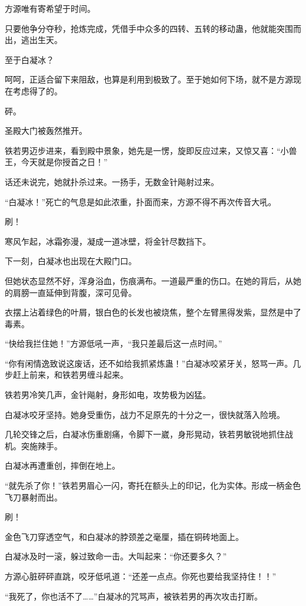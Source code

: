 \begin{this_body}
方源唯有寄希望于时间。

只要他争分夺秒，抢炼完成，凭借手中众多的四转、五转的移动蛊，他就能突围而出，逃出生天。

至于白凝冰？

呵呵，正适合留下来阻敌，也算是利用到极致了。至于她如何下场，就不是方源现在考虑得了的。

砰。

圣殿大门被轰然推开。

铁若男迈步进来，看到殿中景象，她先是一愣，旋即反应过来，又惊又喜：“小兽王，今天就是你授首之日！”

话还未说完，她就扑杀过来。一扬手，无数金针飚射过来。

“白凝冰！”死亡的气息是如此浓重，扑面而来，方源不得不再次传音大吼。

刷！

寒风乍起，冰霜弥漫，凝成一道冰壁，将金针尽数挡下。

下一刻，白凝冰也出现在大殿门口。

但她状态显然不好，浑身浴血，伤痕满布。一道最严重的伤口。在她的背后，从她的肩膀一直延伸到背腹，深可见骨。

衣摆上沾着绿色的叶屑，银白色的长发也被烧焦，整个左臂黑得发紫，显然是中了毒素。

“快给我拦住她！”方源低吼一声，“我只差最后这一点时间。”

“你有闲情逸致说这废话，还不如给我抓紧炼蛊！”白凝冰咬紧牙关，怒骂一声。几步赶上前来，和铁若男缠斗起来。

铁若男冷笑几声，金针飚射，身形如电，攻势极为凶猛。

白凝冰咬牙坚持。她身受重伤，战力不足原先的十分之一，很快就落入险境。

几轮交锋之后，白凝冰伤重剧痛，令脚下一崴，身形晃动，铁若男敏锐地抓住战机。突施辣手。

白凝冰再遭重创，摔倒在地上。

“就先杀了你！”铁若男眉心一闪，寄托在额头上的印记，化为实体。形成一柄金色飞刀暴射而出。

刷！

金色飞刀穿透空气，和白凝冰的脖颈差之毫厘，插在铜砖地面上。

白凝冰及时一滚，躲过致命一击。大叫起来：“你还要多久？”

方源心脏砰砰直跳，咬牙低吼道：“还差一点点。你死也要给我坚持住！！”

“我死了，你也活不了……”白凝冰的咒骂声，被铁若男的再次攻击打断。


\end{this_body}
